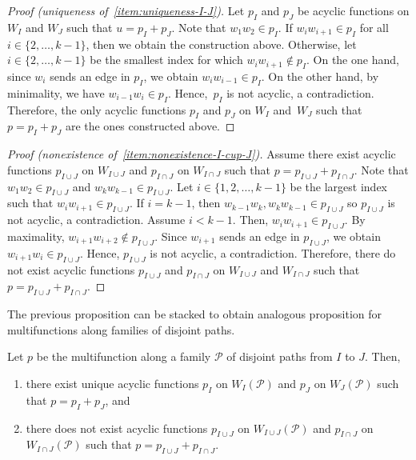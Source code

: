 \begin{proof}[Proof (uniqueness of~\ref{item:uniqueness-I-J})]
    Let \(p_I\) and \(p_J\) be acyclic functions on \(W_I\) and \(W_J\) such that \(u = p_I + p_J\).
    Note that \(w_1 w_2 \in p_I\).
    If \(w_i w_{i+1} \in p_I\) for all \(i \in \{2, \dots, k-1\}\), then we obtain the construction above.
    Otherwise, let \(i \in \{2, \dots, k-1\}\) be the smallest index for which \(w_i w_{i+1} \notin p_I\).
    On the one hand, since \(w_i\) sends an edge in \(p_I\), we obtain \(w_i w_{i-1} \in p_I\).
    On the other hand, by minimality, we have \(w_{i - 1} w_i \in p_I\).
    Hence,~\(p_I\) is not acyclic, a contradiction.
    Therefore, the only acyclic functions \(p_I\) and \(p_J\) on \(W_I\) and~\(W_J\) such that \(p = p_I + p_J\) are the ones constructed above.
\end{proof}

\begin{proof}[Proof (nonexistence of~\ref{item:nonexistence-I-cup-J})]
    Assume there exist acyclic functions \(p_{I \cup J}\) on \(W_{I \cup J}\) and \(p_{I \cap J}\) on \(W_{I \cap J}\) such that \(p = p_{I \cup J} + p_{I \cap J}\).
    Note that \(w_1 w_2 \in p_{I \cup J}\) and \(w_{k} w_{k-1} \in p_{I \cup J}\).
    Let \(i \in \{1, 2, \dots, k-1\}\) be the largest index such that \(w_i w_{i+1} \in p_{I \cup J}\).
    If \(i = k-1\), then \(w_{k-1} w_k, w_k w_{k-1} \in p_{I \cup J}\) so \(p_{I \cup J}\) is not acyclic, a contradiction.
    Assume \(i < k-1\).
    Then, \(w_i w_{i+1} \in p_{I \cup J}\).
    By maximality, \(w_{i+1} w_{i+2} \notin p_{I \cup J}\).
    Since \(w_{i+1}\) sends an edge in \(p_{I \cup J}\), we obtain \(w_{i+1} w_i \in p_{I \cup J}\).
    Hence, \(p_{I \cup J}\) is not acyclic, a contradiction.
    Therefore, there do not exist acyclic functions \(p_{I \cup J}\) and \(p_{I \cap J}\) on \(W_{I \cup J}\) and \(W_{I \cap J}\) such that \(p = p_{I \cup J} + p_{I \cap J}\).
\end{proof}

The previous proposition can be stacked to obtain analogous proposition for multifunctions along families of disjoint paths.

\begin{coro} \label{corollary:disjointpaths}
    Let \(p\) be the multifunction along a family \(\mathcal{P}\) of disjoint paths from \(I\) to \(J\).
    Then,
    \begin{enumerate}[label=(\roman*)]
        \item there exist unique acyclic functions \(p_I\) on \(W_I(\mathcal{P})\) and \(p_J\) on \(W_J(\mathcal{P})\) such that \(p = p_I + p_J\), and
        \item there does not exist acyclic functions \(p_{I \cup J}\) on \(W_{I \cup J}(\mathcal{P})\) and \(p_{I \cap J}\) on \(W_{I \cap J}(\mathcal{P})\) such that \(p = p_{I \cup J} + p_{I \cap J}\).
    \end{enumerate}
\end{coro}

